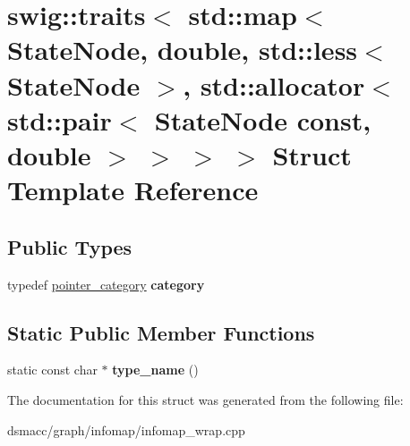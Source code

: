 \hypertarget{structswig_1_1traits_3_01std_1_1map_3_01StateNode_00_01double_00_01std_1_1less_3_01StateNode_01_612233dec930fd56aa4dc389ab2b2fba}{}\section{swig\+:\+:traits$<$ std\+:\+:map$<$ State\+Node, double, std\+:\+:less$<$ State\+Node $>$, std\+:\+:allocator$<$ std\+:\+:pair$<$ State\+Node const, double $>$ $>$ $>$ $>$ Struct Template Reference}
\label{structswig_1_1traits_3_01std_1_1map_3_01StateNode_00_01double_00_01std_1_1less_3_01StateNode_01_612233dec930fd56aa4dc389ab2b2fba}
\subsection*{Public Types}
\begin{DoxyCompactItemize}
\item 
\mbox{\label{structswig_1_1traits_3_01std_1_1map_3_01StateNode_00_01double_00_01std_1_1less_3_01StateNode_01_612233dec930fd56aa4dc389ab2b2fba_a104a1ae4fddd87432435cc2d22ba285c}} 
typedef \mbox{\hyperlink{structswig_1_1pointer__category}{pointer\+\_\+category}} {\bfseries category}
\end{DoxyCompactItemize}
\subsection*{Static Public Member Functions}
\begin{DoxyCompactItemize}
\item 
\mbox{\label{structswig_1_1traits_3_01std_1_1map_3_01StateNode_00_01double_00_01std_1_1less_3_01StateNode_01_612233dec930fd56aa4dc389ab2b2fba_a1a0a4425bbbfa97c5f25fbae178b9381}} 
static const char $\ast$ {\bfseries type\+\_\+name} ()
\end{DoxyCompactItemize}


The documentation for this struct was generated from the following file\+:\begin{DoxyCompactItemize}
\item 
dsmacc/graph/infomap/infomap\+\_\+wrap.\+cpp\end{DoxyCompactItemize}
